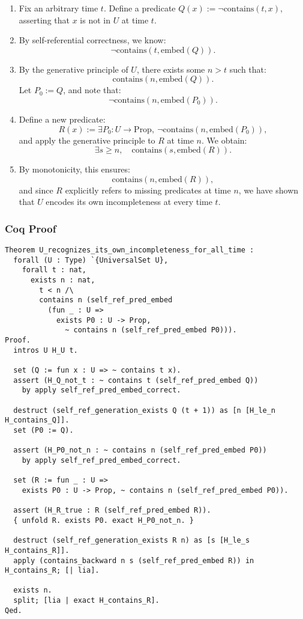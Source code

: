 \documentclass[12pt]{article}
\begin{document}
\begin{enumerate}
    \item Fix an arbitrary time \( t \). Define a predicate \( Q(x) := \neg \text{contains}(t, x) \), asserting that \( x \) is not in \( U \) at time \( t \).

    \item By self-referential correctness, we know:
    \[
    \neg \text{contains}(t, \text{embed}(Q)).
    \]

    \item By the generative principle of \( U \), there exists some \( n > t \) such that:
    \[
    \text{contains}(n, \text{embed}(Q)).
    \]
    Let \( P_0 := Q \), and note that:
    \[
    \neg \text{contains}(n, \text{embed}(P_0)).
    \]

    \item Define a new predicate:
    \[
    R(x) := \exists P_0: U \to \text{Prop}, \ \neg \text{contains}(n, \text{embed}(P_0)),
    \]
    and apply the generative principle to \( R \) at time \( n \). We obtain:
    \[
    \exists s \geq n, \quad \text{contains}(s, \text{embed}(R)).
    \]

    \item By monotonicity, this ensures:
    \[
    \text{contains}(n, \text{embed}(R)),
    \]
    and since \( R \) explicitly refers to missing predicates at time \( n \), we have shown that \( U \) encodes its own incompleteness at every time \( t \).
\end{enumerate}

\subsubsection{Coq Proof}
\begin{lstlisting}[language=Coq]
Theorem U_recognizes_its_own_incompleteness_for_all_time :
  forall (U : Type) `{UniversalSet U},
    forall t : nat,
      exists n : nat,
        t < n /\
        contains n (self_ref_pred_embed
          (fun _ : U =>
            exists P0 : U -> Prop,
              ~ contains n (self_ref_pred_embed P0))).
Proof.
  intros U H_U t.

  set (Q := fun x : U => ~ contains t x).
  assert (H_Q_not_t : ~ contains t (self_ref_pred_embed Q))
    by apply self_ref_pred_embed_correct.

  destruct (self_ref_generation_exists Q (t + 1)) as [n [H_le_n H_contains_Q]].
  set (P0 := Q).

  assert (H_P0_not_n : ~ contains n (self_ref_pred_embed P0))
    by apply self_ref_pred_embed_correct.

  set (R := fun _ : U =>
    exists P0 : U -> Prop, ~ contains n (self_ref_pred_embed P0)).

  assert (H_R_true : R (self_ref_pred_embed R)).
  { unfold R. exists P0. exact H_P0_not_n. }

  destruct (self_ref_generation_exists R n) as [s [H_le_s H_contains_R]].
  apply (contains_backward n s (self_ref_pred_embed R)) in H_contains_R; [| lia].

  exists n.
  split; [lia | exact H_contains_R].
Qed.
\end{lstlisting}
\end{document}
